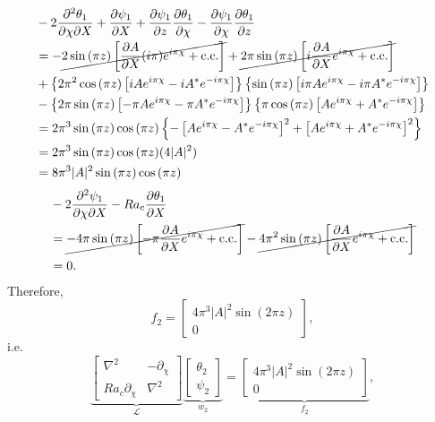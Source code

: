 \documentclass{article}
\newcommand{\pd}[2]{\frac{\partial{#1}}{\partial{#2}}}
\newcommand{\pddmixed}[3]{\frac{\partial^2{#1}}{\partial{#2}\partial{#3}}}
\newcommand{\lap}[1]{\nabla^{2}{#1}}
\begin{document}
\begin{align}
 \begin{split}
  & -2 \pddmixed{\theta_{1}}{\chi}{X} + \pd{\psi_{1}}{X} + \pd{\psi_{1}}{z}\pd{\theta_{1}}{\chi} - \pd{\psi_{1}}{\chi}\pd{\theta_{1}}{z} \\
  & = -\cancel{2\sin{(\pi z)}\left[\pd{A}{X} (i\pi) e^{i \pi \chi} + \textrm{c.c.} \right]} + \cancel{2 \pi \sin{(\pi z)}\left[i \pd{A}{X} e^{i \pi \chi} + \textrm{c.c.} \right]}\\
  & + \left\{2 \pi^{2} \cos{(\pi z)}\left[i A e^{i \pi \chi} - i A^{*} e^{-i \pi \chi} \right]\right\} \left\{\sin{(\pi z)}\left[i \pi A e^{i \pi \chi} - i \pi A^{*} e^{-i \pi \chi} \right] \right\}\\
  & - \left\{2 \pi \sin{(\pi z)}\left[- \pi A e^{i \pi \chi} - \pi A^{*}  e^{-i \pi \chi} \right] \right\} \left\{\pi \cos{(\pi z)}\left[A e^{i \pi \chi} + A^{*} e^{-i \pi \chi} \right]  \right\}\\
  & = 2\pi^{3}\sin{(\pi z)}\cos{(\pi z)} \left\{- \left[A e^{i \pi \chi} -  A^{*} e^{-i \pi \chi} \right]^{2} + \left[A e^{i \pi \chi} + A^{*}  e^{-i \pi \chi} \right]^{2}  \right\}\\
  & = 2\pi^{3}\sin{(\pi z)}\cos{(\pi z)} (4 |A|^{2})\\
  & = 8 \pi^{3} |A|^{2} \sin{(\pi z)}\cos{(\pi z)}
 \end{split}
\end{align}
%
\begin{align}
 \begin{split}
  & -2\pddmixed{\psi_{1}}{\chi}{X} - Ra_{c}\pd{\theta_{1}}{X} \\
  & = \cancel{-4\pi  \sin{(\pi z)}\left[-\pi \pd{A}{X} e^{i \pi \chi} + \textrm{c.c.} \right]}
  - \cancel{4\pi^{2} \sin{(\pi z)}\left[ \pd{A}{X} e^{i \pi \chi} + \textrm{c.c.} \right]}\\
  & = 0.
 \end{split}
\end{align}
%
Therefore,
\begin{equation}
f_{2} = 
 \begin{bmatrix}
  4 \pi^{3} |A|^{2} \sin{(2 \pi z)} \\
  0
 \end{bmatrix},
\end{equation}
i.e.
\begin{equation}\label{eq:order_2}
 \underbrace{\begin{bmatrix}
  \lap{} & -\partial_{\chi} \\
  Ra_{c}\partial_{\chi} & \lap{}
 \end{bmatrix}}_{\mathcal{L}}
 \underbrace{\begin{bmatrix}
  \theta_{2} \\
 \psi_{2}
 \end{bmatrix}}_{w_{2}}
 = \underbrace{ \begin{bmatrix}
  4 \pi^{3} |A|^{2} \sin{(2 \pi z)} \\
  0
 \end{bmatrix}
}_{f_{2}},
\end{equation}
\end{document}
